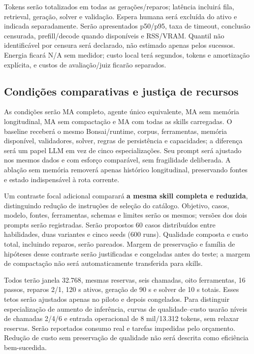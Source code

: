\documentclass[12pt]{article}
\begin{document}
Tokens serão totalizados em todas as gerações/reparos; latência incluirá fila, retrieval, geração, solver e validação. Espera humana será excluída do ativo e indicada separadamente. Serão apresentados p50/p95, taxa de timeout, conclusão censurada, prefill/decode quando disponíveis e RSS/VRAM. Quantil não identificável por censura será declarado, não estimado apenas pelos sucessos. Energia ficará N/A sem medidor; custo local terá segundos, tokens e amortização explícita, e custos de avaliação/juiz ficarão separados.

\subsection{Condições comparativas e justiça de recursos}

As condições serão MA completo, agente único equivalente, MA sem memória longitudinal, MA sem compactação e MA com todas as skills carregadas. O baseline receberá o mesmo Bonsai/runtime, corpus, ferramentas, memória disponível, validadores, solver, regras de persistência e capacidades; a diferença será um papel LLM em vez de cinco especializações. Seu prompt será ajustado nos mesmos dados e com esforço comparável, sem fragilidade deliberada. A ablação sem memória removerá apenas histórico longitudinal, preservando fontes e estado indispensável à rota corrente.

Um contraste focal adicional comparará \textbf{a mesma skill completa e reduzida}, distinguindo redução de instruções de seleção do catálogo. Objetivo, casos, modelo, fontes, ferramentas, schemas e limites serão os mesmos; versões dos dois prompts serão registradas. Serão propostos 60 casos distribuídos entre habilidades, duas variantes e cinco seeds (600 runs). Qualidade composta e custo total, incluindo reparos, serão pareados. Margem de preservação e família de hipóteses desse contraste serão justificadas e congeladas antes do teste; a margem de compactação não será automaticamente transferida para skills.

Todos terão janela 32.768, mesmas reservas, seis chamadas, oito ferramentas, 16 passos, reparos 2/1, 120 s ativos, geração de 90 s e solver de 10 s totais. Esses tetos serão ajustados apenas no piloto e depois congelados. Para distinguir especialização de aumento de inferência, curvas de qualidade--custo usarão níveis de chamadas 2/4/6 e entrada operacional de 8 mil/13.312 tokens, sem relaxar reservas. Serão reportados consumo real e tarefas impedidas pelo orçamento. Redução de custo sem preservação de qualidade não será descrita como eficiência bem-sucedida.
\end{document}
